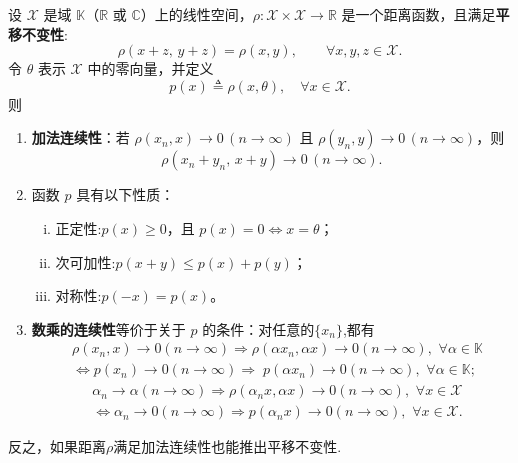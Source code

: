\documentclass[../../main.tex]{subfiles}%
\begin{document}
\begin{theorem}
设 $\mathscr{X}$ 是域 $\mathbb{K}$（$\mathbb{R}$ 或 $\mathbb{C}$）上的线性空间，$\rho:\mathscr{X}\times\mathscr{X}\to\mathbb{R}$ 是一个距离函数，且满足\textbf{平移不变性}:
\[
\rho(x+z,\,y+z)=\rho(x,y),\qquad \forall x,y,z\in\mathscr{X}.
\]
令 $\theta$ 表示 $\mathscr{X}$ 中的零向量，并定义
\[
p(x)\triangleq \rho(x,\theta),\quad \forall x\in\mathscr{X}.
\]
则
\begin{enumerate}[(1)]
\item \textbf{加法连续性}：若 $\rho(x_n,x)\to0\,(n\to\infty)$ 且 $\rho(y_n,y)\to0\,(n\to\infty)$，则
\[
\rho(x_n+y_n,\,x+y)\to0\,(n\to\infty).
\]

\item 函数 $p$ 具有以下性质：
\begin{enumerate}[(i)]
\item 正定性:$p(x)\geqslant 0$，且 $p(x)=0\iff x=\theta$；
\item 次可加性:$p(x+y)\leqslant p(x)+p(y)$；
\item 对称性:$p(-x)=p(x)$。
\end{enumerate}

\item[(3)] \textbf{数乘的连续性}等价于关于 $p$ 的条件：对任意的$\{x_n\}$,都有
\begin{align*}
&\rho (x_n,x)\rightarrow 0\left( n\rightarrow \infty \right) \Longrightarrow \rho (\alpha x_n,\alpha x)\rightarrow 0\left( n\rightarrow \infty \right) ,\,\,\forall \alpha \in \mathbb{K} 
\\
&\Longleftrightarrow p(x_n)\rightarrow 0\left( n\rightarrow \infty \right) \Longrightarrow \;p(\alpha x_n)\rightarrow 0\left( n\rightarrow \infty \right) ,\,\,\forall \alpha \in \mathbb{K} ;
\end{align*}
\begin{align*}
&\alpha _n\rightarrow \alpha\left( n\rightarrow \infty \right)  \Longrightarrow \rho (\alpha _nx,\alpha x)\rightarrow 0\left( n\rightarrow \infty \right) ,\,\,\forall x\in \mathscr{X} 
\\
&\Longleftrightarrow \alpha _n\rightarrow 0\left( n\rightarrow \infty \right) \Longrightarrow p(\alpha _nx)\rightarrow 0\left( n\rightarrow \infty \right) ,\,\,\forall x\in \mathscr{X} .
\end{align*}
\end{enumerate}
\end{theorem}
\begin{remark}
反之，如果距离$\rho$满足加法连续性也能推出平移不变性.
\end{remark}
\end{document}
